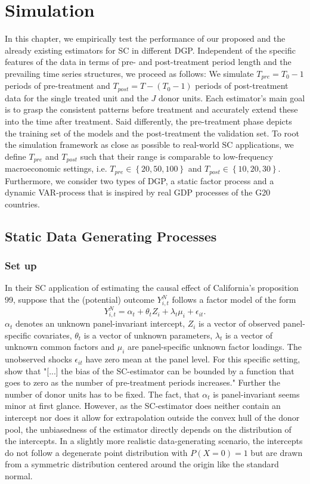 \section{Simulation}
In this chapter, we empirically test the performance of our proposed and the already existing estimators for \ac{SC} in different \ac{DGP}. Independent of the specific features of the data in terms of pre- and post-treatment period length and the prevailing time series structures, we proceed as follows: We simulate $T_{pre} = T_0 -1$ periods of pre-treatment and $T_{post} = T - (T_0 -1)$ periods of post-treatment data for the single treated unit and the $J$ donor units. Each estimator's main goal is to grasp the consistent patterns before treatment and accurately extend these into the time after treatment. Said differently, the pre-treatment phase depicts the training set of the models and the post-treatment the validation set. To root the simulation framework as close as possible to real-world \ac{SC} applications, we define $T_{pre}$ and $T_{post}$ such that their range is comparable to low-frequency macroeconomic settings, i.e. $T_{pre} \in \left\lbrace 20,50,100\right\rbrace $ and $T_{post} \in \left\lbrace 10,20,30\right\rbrace$. Furthermore, we consider two types of \ac{DGP}, a static factor process and a dynamic \ac{VAR}-process that is inspired by real \ac{GDP} processes of the G20 countries.

\subsection{Static Data Generating Processes}
\subsubsection{Set up}
In their \ac{SC} application of estimating the causal effect of California's proposition 99, \cite{abadie:2010} suppose that the (potential) outcome $Y_{i,t}^{N}$ follows a factor model of the  form 
\begin{equation*}
	Y_{i,t}^{N} = \alpha_t + \theta_t Z_i + \lambda_t \mu_i + \epsilon_{it}.
\end{equation*}
$\alpha_t$ denotes an unknown panel-invariant intercept, $Z_i$ is a vector of observed panel-specific covariates, $\theta_t$ is a vector of unknown parameters, $\lambda_t$ is a vector of unknown common factors and $\mu_i$ are panel-specific unknown factor loadings. The unobserved shocks $\epsilon_{it}$ have zero mean at the panel level. 
For this specific setting, \cite{abadie:2010} show that "[...] the bias of the SC-estimator can be bounded by a function that goes to zero as the number of pre-treatment periods increases." Further the number of donor units has to be fixed. The fact, that $\alpha_t$ is panel-invariant seems minor at first glance. However, as the \ac{SC}-estimator does neither contain an intercept nor does it allow for extrapolation outside the convex hull of the donor pool, the unbiasedness of the estimator directly depends on the distribution of the intercepts. In a slightly more realistic data-generating scenario, the intercepts do not follow a degenerate point distribution with $P(X = 0) = 1$ but are drawn from a symmetric distribution centered around the origin like the standard normal. 

